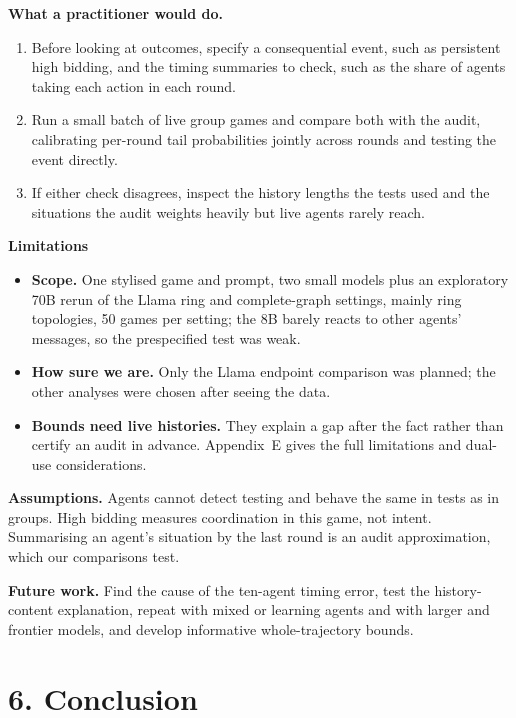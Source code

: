 \documentclass[11pt,letterpaper]{article}
\newcommand{\parahead}[1]{\par\textbf{#1}\par}
\begin{document}
\textbf{What a practitioner would do.}
\begin{enumerate}
  \item Before looking at outcomes, specify a consequential event, such as persistent high bidding, and the timing summaries to check, such as the share of agents taking each action in each round.
  \item Run a small batch of live group games and compare both with the audit, calibrating per-round tail probabilities jointly across rounds and testing the event directly.
  \item If either check disagrees, inspect the history lengths the tests used and the situations the audit weights heavily but live agents rarely reach.
\end{enumerate}

\parahead{Limitations}
\begin{itemize}
  \item \textbf{Scope.} One stylised game and prompt, two small models plus an exploratory 70B rerun of the Llama ring and complete-graph settings, mainly ring topologies, 50 games per setting; the 8B barely reacts to other agents' messages, so the prespecified test was weak.
  \item \textbf{How sure we are.} Only the Llama endpoint comparison was planned; the other analyses were chosen after seeing the data.
  \item \textbf{Bounds need live histories.} They explain a gap after the fact rather than certify an audit in advance.
    Appendix~E gives the full limitations and dual-use considerations.
\end{itemize}

\textbf{Assumptions.}
Agents cannot detect testing and behave the same in tests as in groups.
High bidding measures coordination in this game, not intent.
Summarising an agent's situation by the last round is an audit approximation, which our comparisons test.

\textbf{Future work.}
Find the cause of the ten-agent timing error, test the history-content explanation, repeat with mixed or learning agents and with larger and frontier models, and develop informative whole-trajectory bounds.

\section{6. Conclusion}
\end{document}
